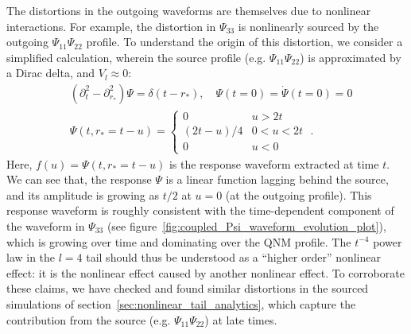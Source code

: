 \documentclass[reprint,aps,physrev,superscriptaddress,10pt,notitlepage,prd,nofootinbib,onecolumn]{revtex4-2}
\newcommand{\fref}[1]{figure~\ref{#1}}
\newcommand{\sref}[1]{section~\ref{#1}}
\begin{document}
The distortions in the outgoing waveforms are themselves due to nonlinear interactions.
For example, the distortion in $\Psi_{33}$ is nonlinearly sourced by the outgoing $\Psi_{11} \Psi_{22}$ profile.
To understand the origin of this distortion, we consider a simplified calculation, wherein the source profile (e.g. $\Psi_{11} \Psi_{22}$) is approximated by a Dirac delta, and $V_l \approx 0$:
\begin{align}
  & (\partial_t^2 -  \partial_{r_*}^2) \Psi =  \delta(t-r_*),\quad
    \Psi(t=0) = \dot{\Psi}(t=0) = 0 \nonumber \\
  & \Psi(t,r_* = t-u) =
    \begin{cases}
      0 & u > 2t \\
      (2t-u) / 4 & 0 < u < 2t \\
      0 & u < 0
    \end{cases}
    \;.
\end{align}
Here, $f(u) = \Psi(t, r_* = t-u)$ is the response waveform extracted at time $t$.
We can see that, the response $\Psi$ is a linear function lagging behind the source, and its amplitude is growing as $t/2$ at $u = 0$ (at the outgoing profile).
This response waveform is roughly consistent with the time-dependent component of the waveform in $\Psi_{33}$ (see \fref{fig:coupled_Psi_waveform_evolution_plot}), which is growing over time and dominating over the QNM profile.
The $t^{-4}$ power law in the $l=4$ tail should thus be understood as a ``higher order'' nonlinear effect: it is the nonlinear effect caused by another nonlinear effect.
To corroborate these claims, we have checked and found similar distortions in the sourced simulations of \sref{sec:nonlinear_tail_analytics}, which capture the contribution from the source (e.g. $\Psi_{11}\Psi_{22}$) at late times.
\end{document}
